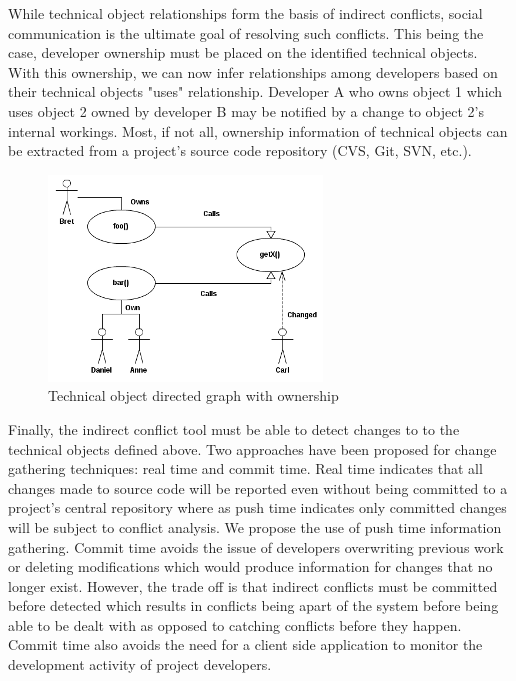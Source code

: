 \documentclass[conference]{IEEEtran}
\begin{document}
While technical object relationships form the basis of indirect conflicts,
social communication is the ultimate goal of resolving such conflicts.
This being the case, developer ownership must be placed on the 
identified technical objects. With this ownership, we can now infer
relationships among developers based on their technical objects
"uses" relationship. Developer A who owns object 1 which uses 
object 2 owned by developer B may be notified by a change to
object 2's internal workings. Most, if not all, ownership information
of technical objects can be extracted from a project's source code
repository (CVS, Git, SVN, etc.).\\

\begin{figure}[t!]
\includegraphics{images/CallGraph}
\caption{Technical object directed graph with ownership\label{fig:graph}}
\end{figure}

Finally, the indirect conflict tool must be able to detect changes to
to the technical objects defined above. Two approaches have been 
proposed for change gathering techniques: real time and commit time.
Real time indicates that all changes made to source code will be
reported even without being committed to a project's central 
repository where as push time indicates only committed changes
will be subject to conflict analysis. We propose the use of push time
information gathering. Commit time avoids the issue of developers 
overwriting previous work or deleting modifications which would 
produce information for changes that no longer exist. However, the
trade off is that indirect conflicts must be committed before detected
which results in conflicts being apart of the system before being able
to be dealt with as opposed to catching conflicts before they happen.
Commit time also avoids the need for a client side application to 
monitor the development activity of project developers.\\
\end{document}

